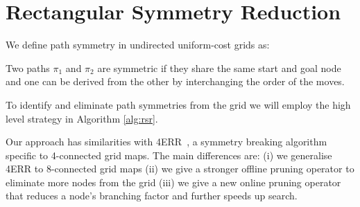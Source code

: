 \section{Rectangular Symmetry Reduction}
\label{sec:rsr}

We define path symmetry in undirected uniform-cost grids as:
\begin{definition}
\label{def:symmetry}
Two paths $\pi_{1}$ and $\pi_{2}$ are symmetric if they share the same start and
goal node and one can be derived from the other by interchanging the order of the
moves.
\end{definition}

To identify and eliminate path symmetries from the grid we will employ the high 
level strategy in Algorithm \ref{alg:rsr}.



Our approach has similarities with 4ERR~\cite{harabor10}, a symmetry breaking algorithm 
specific to 4-connected grid maps.
The main differences are: (i) we generalise 4ERR to 8-connected grid maps 
(ii) we give a stronger offline pruning operator to eliminate more nodes from
the grid (iii) we give a new online pruning operator that reduces a node's branching
factor and further speeds up search.

